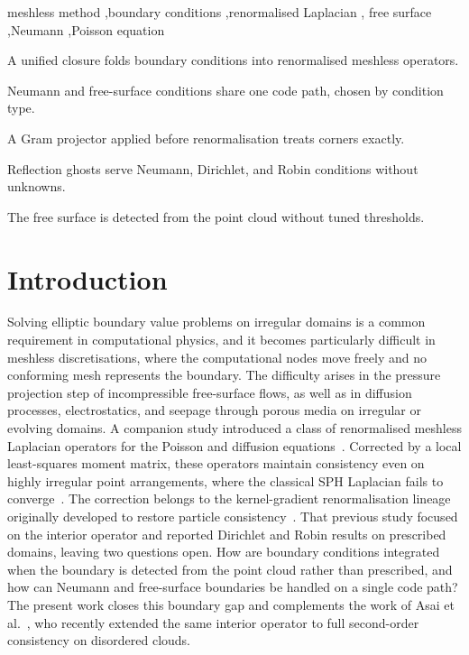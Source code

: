 \documentclass[preprint,review,12pt]{elsarticle}
\begin{document}
\begin{frontmatter}
\begin{keyword}
meshless method \sep boundary conditions \sep renormalised Laplacian \sep
free surface \sep Neumann \sep Poisson equation
\end{keyword}

\begin{highlights}
\item A unified closure folds boundary conditions into renormalised meshless operators.
\item Neumann and free-surface conditions share one code path, chosen by condition type.
\item A Gram projector applied before renormalisation treats corners exactly.
\item Reflection ghosts serve Neumann, Dirichlet, and Robin conditions without unknowns.
\item The free surface is detected from the point cloud without tuned thresholds.
\end{highlights}

\end{frontmatter}

\section{Introduction}
\label{sec:intro}

Solving elliptic boundary value problems on irregular domains is a common requirement in computational physics, and it becomes particularly difficult in meshless discretisations, where the computational nodes move freely and no conforming mesh represents the boundary.
The difficulty arises in the pressure projection step of incompressible free-surface flows, as well as in diffusion processes, electrostatics, and seepage through porous media on irregular or evolving domains.
A companion study introduced a class of renormalised meshless Laplacian operators for the Poisson and diffusion equations~\cite{Basic2018}.
Corrected by a local least-squares moment matrix, these operators maintain consistency even on highly irregular point arrangements, where the classical SPH Laplacian fails to converge~\cite{Brookshaw1985,Monaghan1983,Fatehi2011}.
The correction belongs to the kernel-gradient renormalisation lineage originally developed to restore particle consistency~\cite{Randles1996,Bonet1999,Sigalotti2021}.
That previous study focused on the interior operator and reported Dirichlet and Robin results on prescribed domains, leaving two questions open.
How are boundary conditions integrated when the boundary is detected from the point cloud rather than prescribed, and how can Neumann and free-surface boundaries be handled on a single code path?
The present work closes this boundary gap and complements the work of Asai et al.~\cite{Asai2023}, who recently extended the same interior operator to full second-order consistency on disordered clouds.
\end{document}
